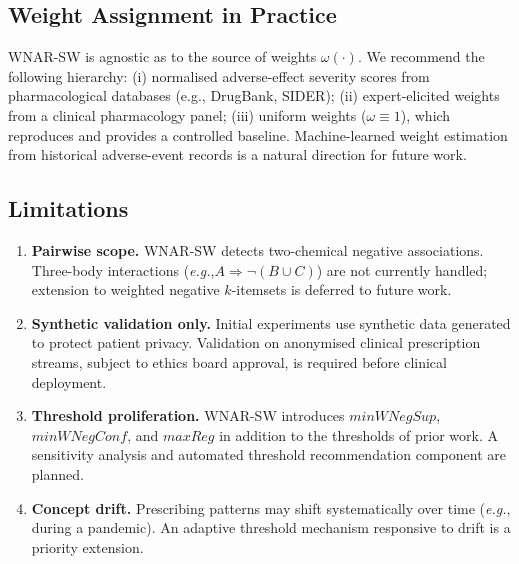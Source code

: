 \documentclass[10pt,twocolumn]{article}
\theoremstyle{plain}
\theoremstyle{definition}
\theoremstyle{remark}
\newcommand{\eg}{\textit{e.g.},\xspace}
\begin{document}
\subsection{Weight Assignment in Practice}

WNAR-SW is agnostic as to the source of weights $\omega(\cdot)$.
We recommend the following hierarchy:
(i) normalised adverse-effect severity scores from pharmacological
databases (e.g., DrugBank, SIDER);
(ii) expert-elicited weights from a clinical pharmacology panel;
(iii) uniform weights ($\omega \equiv 1$), which reproduces
\cite{sastry2025} and provides a controlled baseline.
Machine-learned weight estimation from historical adverse-event records
is a natural direction for future work.

\subsection{Limitations}

\begin{enumerate}[leftmargin=*, label=\textbf{Lim.\arabic*.}]
  \item \textbf{Pairwise scope.}
        WNAR-SW detects two-chemical negative associations.
        Three-body interactions (\eg $A \Rightarrow \lnot (B \cup C)$)
        are not currently handled; extension to weighted negative
        $k$-itemsets is deferred to future work.

  \item \textbf{Synthetic validation only.}
        Initial experiments use synthetic data generated to protect
        patient privacy.
        Validation on anonymised clinical prescription streams, subject
        to ethics board approval, is required before clinical deployment.

  \item \textbf{Threshold proliferation.}
        WNAR-SW introduces $\mathit{minWNegSup}$, $\mathit{minWNegConf}$,
        and $\mathit{maxReg}$ in addition to the thresholds of prior work.
        A sensitivity analysis and automated threshold recommendation
        component are planned.

  \item \textbf{Concept drift.}
        Prescribing patterns may shift systematically over time
        (\eg during a pandemic).
        An adaptive threshold mechanism responsive to drift is a priority
        extension.
\end{enumerate}

\end{document}
